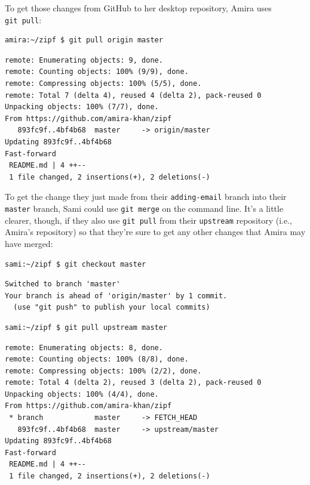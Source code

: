 \documentclass[
]{krantz}
\begin{document}
To get those changes from GitHub to her desktop repository,
Amira uses \texttt{git\ pull}:

\begin{verbatim}
amira:~/zipf $ git pull origin master
\end{verbatim}

\begin{verbatim}
remote: Enumerating objects: 9, done.
remote: Counting objects: 100% (9/9), done.
remote: Compressing objects: 100% (5/5), done.
remote: Total 7 (delta 4), reused 4 (delta 2), pack-reused 0
Unpacking objects: 100% (7/7), done.
From https://github.com/amira-khan/zipf
   893fc9f..4bf4b68  master     -> origin/master
Updating 893fc9f..4bf4b68
Fast-forward
 README.md | 4 ++--
 1 file changed, 2 insertions(+), 2 deletions(-)
\end{verbatim}

To get the change they just made from their \texttt{adding-email} branch into their \texttt{master} branch,
Sami could use \texttt{git\ merge} on the command line.
It's a little clearer,
though,
if they also use \texttt{git\ pull} from their \texttt{upstream} repository (i.e., Amira's repository)
so that they're sure to get any other changes that Amira may have merged:

\begin{verbatim}
sami:~/zipf $ git checkout master
\end{verbatim}

\begin{verbatim}
Switched to branch 'master'
Your branch is ahead of 'origin/master' by 1 commit.
  (use "git push" to publish your local commits)
\end{verbatim}

\begin{verbatim}
sami:~/zipf $ git pull upstream master
\end{verbatim}

\begin{verbatim}
remote: Enumerating objects: 8, done.
remote: Counting objects: 100% (8/8), done.
remote: Compressing objects: 100% (2/2), done.
remote: Total 4 (delta 2), reused 3 (delta 2), pack-reused 0
Unpacking objects: 100% (4/4), done.
From https://github.com/amira-khan/zipf
 * branch            master     -> FETCH_HEAD
   893fc9f..4bf4b68  master     -> upstream/master
Updating 893fc9f..4bf4b68
Fast-forward
 README.md | 4 ++--
 1 file changed, 2 insertions(+), 2 deletions(-)
\end{verbatim}
\end{document}
